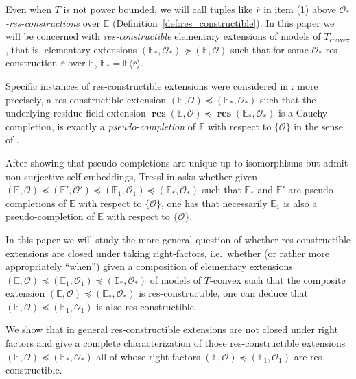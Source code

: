 \documentclass{amsart}
\theoremstyle{remark}
\theoremstyle{definition}
\theoremstyle{plain}
\newcommand{\bE}{\mathbb E}
\newcommand{\cO}{\mathcal O}
\newcommand{\convex}{\mathrm{convex}}
\DeclareMathOperator{\res}{\mathbf{res}}
\theoremstyle{plain}
\begin{document}
Even when $T$ is not power bounded, we will call tuples like $\overline{r}$ in item (1) above \emph{$\cO_*$-res-constructions} over $\bE$ (Definition~\ref{def:res_constructible}). In this paper we will be concerned with \emph{res-constructible} elementary extensions of models of $T_\convex$, that is, elementary extensions $(\bE_*, \cO_*) \succeq (\bE, \cO)$ such that for some $\cO_*$-res-construction $\overline{r}$ over $\bE$, $\bE_* = \bE \langle \overline{r}\rangle$.

Specific instances of res-constructible extensions were considered in \cite{tressl2006pseudo}: more precisely, a res-constructible extension $(\bE, \cO) \preceq (\bE_*, \cO_*)$ such that the underlying residue field extension $\res(\bE, \cO) \preceq \res(\bE_*, \cO_*)$ is a Cauchy-completion, is exactly a \emph{pseudo-completion} of $\bE$ with respect to $\{\cO\}$ in the sense of \cite[Def.~4.2]{tressl2006pseudo}.

After showing that pseudo-completions are unique up to isomorphisms but admit non-surjective self-embeddings, Tressl in \cite[Problem~5.12]{tressl2006pseudo} asks whether given $(\bE, \cO) \preceq (\bE', \cO') \preceq (\bE_1, \cO_1) \preceq (\bE_*, \cO_*)$ such that $\bE_*$ and $\bE'$ are pseudo-completions of $\bE$ with respect to $\{\cO\}$, one has that necessarily $\bE_1$ is also a pseudo-completion of $\bE$ with respect to $\{\cO\}$.

In this paper we will study the more general question of whether res-constructible extensions are closed under taking right-factors, i.e.\ whether (or rather more appropriately ``when'') given a composition of elementary extensions $(\bE, \cO) \preceq (\bE_1, \cO_1) \preceq (\bE_*, \cO_*)$ of models of $T$-convex such that the composite extension $(\bE, \cO) \preceq (\bE_*, \cO_*)$ is res-constructible, one can deduce that $(\bE, \cO) \preceq (\bE_1, \cO_1)$ is also res-constructible.

We show that in general res-constructible extensions are not closed under right factors and give a complete characterization of those res-constructible extensions $(\bE, \cO)\preceq (\bE_*, \cO_*)$ all of whose right-factors $(\bE, \cO) \preceq (\bE_1, \cO_1)$ are res-constructible.
\end{document}
